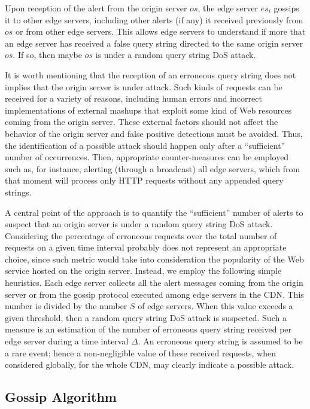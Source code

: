 \documentclass{IEEEtran}
\begin{document}
Upon reception of the alert from the origin server $os$, the edge server $es_i$ gossips it to other edge servers, including other alerts (if any) it received previously from $os$ or from other edge servers.
This allows edge servers to understand if more that an edge server has received a false query string directed to the same origin server $os$. If so, then maybe $os$ is under a random query string DoS attack.

It is worth mentioning that the reception of an erroneous query string does not implies that the origin server is under attack. Such kinds of requests can be received for a variety of reasons, including human errors and incorrect implementations of external mashups that exploit some kind of Web resources coming from the origin server. These external factors should not affect the behavior of the origin server and false positive detections must be avoided. Thus, the identification of a possible attack should happen only after a ``sufficient'' number of occurrences. Then, appropriate counter-measures can be employed such as, for instance, alerting (through a broadcast) all edge servers, which from that moment will process only HTTP requests without any appended query strings.

A central point of the approach is to quantify the ``sufficient'' number of alerts to suspect that an origin server is under a random query string DoS attack. Considering the percentage of erroneous requests over the total number of requests on a given time interval probably does not represent an appropriate choice, since such metric would take into consideration the popularity of the Web service hosted on the origin server.
Instead, we employ the following simple heuristics. Each edge server collects all the alert messages coming from the origin server or from the gossip protocol executed among edge servers in the CDN. This number is divided by the number $S$ of edge servers. When this value exceeds a given threshold, then a random query string DoS attack is suspected. Such a measure is an estimation of the number of erroneous query string received per edge server during a time interval $\Delta$. An erroneous query string is assumed to be a rare event; hence a non-negligible value of these received requests, when considered globally, for the whole CDN, may clearly indicate a possible attack.

\subsection{Gossip Algorithm}
\end{document}
